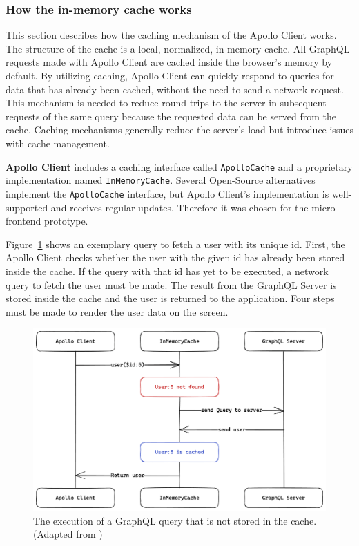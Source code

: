 \subsubsection{How the in-memory cache works}\label{subsubsection:background:graphql:apollo-server-client:in-memory-cache-working}

This section describes how the caching mechanism of the Apollo Client works. The structure of the cache is a local, normalized, in-memory cache. All GraphQL requests made with Apollo Client are cached inside the browser's memory by default. By utilizing caching, Apollo Client can quickly respond to queries for data that has already been cached, without the need to send a network request. This mechanism is needed to reduce round-trips to the server in subsequent requests of the same query because the requested data can be served from the cache. \cite{misc:-:background:graphql:apollo-client-cache-overview} Caching mechanisms generally reduce the server's load but introduce issues with cache management.

\bigskip

\noindent \textbf{Apollo Client} includes a caching interface called \texttt{ApolloCache} and a proprietary implementation named \texttt{InMemoryCache}. Several Open-Source alternatives implement the \texttt{ApolloCache} interface, but Apollo Client's implementation is well-supported and receives regular updates. Therefore it was chosen for the micro-frontend prototype.

\bigskip

\noindent Figure~\ref{fig:background:graphql:user-query-first-time} shows an exemplary query to fetch a user with its unique id. First, the Apollo Client checks whether the user with the given id has already been stored inside the cache. If the query with that id has yet to be executed, a network query to fetch the user must be made. The result from the GraphQL Server is stored inside the cache and the user is returned to the application. Four steps must be made to render the user data on the screen. \cite{misc:-:background:graphql:apollo-client-cache-overview}

\ifshowImages
\begin{figure}[H]
  \centering
  \includegraphics[width=0.6\linewidth]{images/background/graphql/apollo/apollo-client-basic-cache.png}
  \caption{The execution of a GraphQL query that is not stored in the cache. (Adapted from \cite{misc:-:background:graphql:apollo-client-cache-overview})}\label{fig:background:graphql:user-query-first-time}
\end{figure}
\fi

